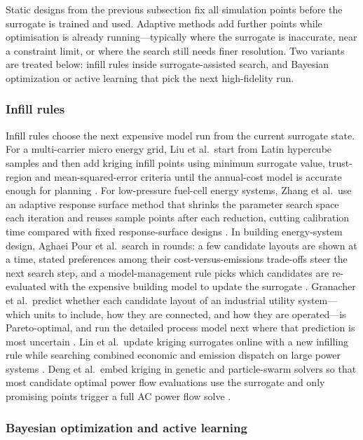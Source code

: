 Static designs from the previous subsection fix all simulation points
before the surrogate is trained and used. Adaptive methods add further
points while optimisation is already running---typically where the
surrogate is inaccurate, near a constraint limit, or where the search
still needs finer resolution. Two variants are treated below: infill
rules inside surrogate-assisted search, and Bayesian optimization or
active learning that pick the next high-fidelity run.

\subsubsection{Infill rules}
\label{sec:doe:infill}

Infill rules choose the next expensive model run from the current
surrogate state. For a multi-carrier micro energy grid, Liu et al.\
start from Latin hypercube samples and then add kriging infill points
using minimum surrogate value, trust-region and mean-squared-error
criteria until the annual-cost model is accurate enough for planning
\cite{Liu201914569}. For low-pressure fuel-cell energy systems, Zhang
et al.\ use an adaptive response surface method that shrinks the
parameter search space each iteration and reuses sample points after
each reduction, cutting calibration time compared with fixed
response-surface designs \cite{Zhang2025__7}. In building
energy-system design, Aghaei Pour et al.\ search in rounds: a few
candidate layouts are shown at a time, stated preferences among their
cost-versus-emissions trade-offs steer the next search step, and a
model-management rule picks which candidates are re-evaluated with the
expensive building model to update the surrogate
\cite{Aghaei Pour2022303}. Granacher et al.\ predict whether each
candidate layout of an industrial utility system---which units to
include, how they are connected, and how they are operated---is
Pareto-optimal, and run the detailed process model next where that
prediction is most uncertain \cite{Granacher20221573}. Lin et al.\ update kriging surrogates online
with a new infilling rule while searching combined economic and
emission dispatch on large power systems \cite{Lin2023}. Deng et al.\
embed kriging in genetic and particle-swarm solvers so that most
candidate optimal power flow evaluations use the surrogate and only
promising points trigger a full AC power flow solve
\cite{Deng2020831}.

\subsubsection{Bayesian optimization and active learning}
\label{sec:doe:bo_al}

